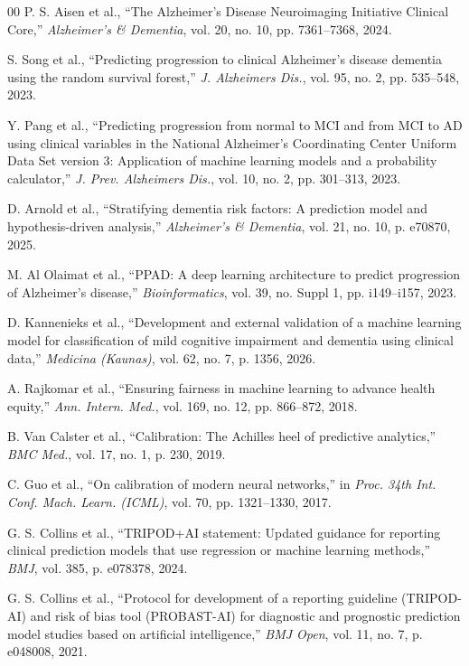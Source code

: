 \documentclass[preprint,12pt]{elsarticle}
\begin{document}
\begin{thebibliography}{00}
 P. S. Aisen et al., ``The Alzheimer's Disease Neuroimaging Initiative Clinical Core,'' \textit{Alzheimer's \& Dementia}, vol. 20, no. 10, pp. 7361--7368, 2024.

 S. Song et al., ``Predicting progression to clinical Alzheimer's disease dementia using the random survival forest,'' \textit{J. Alzheimers Dis.}, vol. 95, no. 2, pp. 535--548, 2023.

 Y. Pang et al., ``Predicting progression from normal to MCI and from MCI to AD using clinical variables in the National Alzheimer's Coordinating Center Uniform Data Set version 3: Application of machine learning models and a probability calculator,'' \textit{J. Prev. Alzheimers Dis.}, vol. 10, no. 2, pp. 301--313, 2023.

 D. Arnold et al., ``Stratifying dementia risk factors: A prediction model and hypothesis-driven analysis,'' \textit{Alzheimer's \& Dementia}, vol. 21, no. 10, p. e70870, 2025.

 M. Al Olaimat et al., ``PPAD: A deep learning architecture to predict progression of Alzheimer's disease,'' \textit{Bioinformatics}, vol. 39, no. Suppl 1, pp. i149--i157, 2023.

 D. Kannenieks et al., ``Development and external validation of a machine learning model for classification of mild cognitive impairment and dementia using clinical data,'' \textit{Medicina (Kaunas)}, vol. 62, no. 7, p. 1356, 2026.

 A. Rajkomar et al., ``Ensuring fairness in machine learning to advance health equity,'' \textit{Ann. Intern. Med.}, vol. 169, no. 12, pp. 866--872, 2018.

 B. Van Calster et al., ``Calibration: The Achilles heel of predictive analytics,'' \textit{BMC Med.}, vol. 17, no. 1, p. 230, 2019.

 C. Guo et al., ``On calibration of modern neural networks,'' in \textit{Proc. 34th Int. Conf. Mach. Learn. (ICML)}, vol. 70, pp. 1321--1330, 2017.

 G. S. Collins et al., ``TRIPOD+AI statement: Updated guidance for reporting clinical prediction models that use regression or machine learning methods,'' \textit{BMJ}, vol. 385, p. e078378, 2024.

 G. S. Collins et al., ``Protocol for development of a reporting guideline (TRIPOD-AI) and risk of bias tool (PROBAST-AI) for diagnostic and prognostic prediction model studies based on artificial intelligence,'' \textit{BMJ Open}, vol. 11, no. 7, p. e048008, 2021.


\end{thebibliography}
\end{document}
